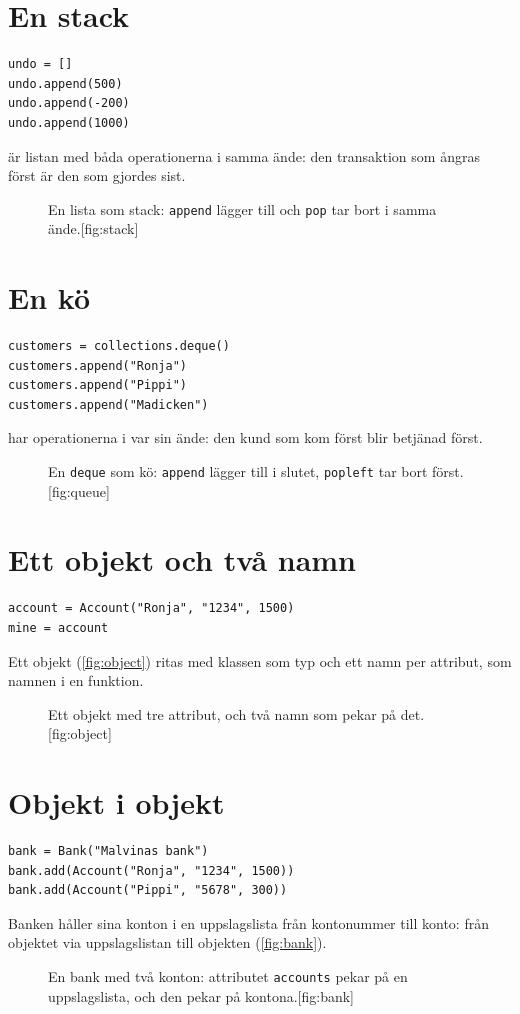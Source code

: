\documentclass[a4paper,10pt,oneside,openright,
               oldfontcommands]{memoir}
\newcommand{\entry}[3]{%
  \begin{figure}[htbp]
    \begin{sidecaption}{#2}[fig:#1]
      #3
    \end{sidecaption}
  \end{figure}
}
\begin{document}
\section{En stack}

\begin{verbatim}
undo = []
undo.append(500)
undo.append(-200)
undo.append(1000)
\end{verbatim}
 är listan med båda operationerna i samma ände: den
transaktion som ångras först är den som gjordes sist.
\entry{stack}{En lista som stack: \texttt{append} lägger till och
  \texttt{pop} tar bort i samma ände.}{\figStack}

\section{En kö}

\begin{verbatim}
customers = collections.deque()
customers.append("Ronja")
customers.append("Pippi")
customers.append("Madicken")
\end{verbatim}
 har operationerna i var sin ände: den kund som kom
först blir betjänad först.
\entry{queue}{En \texttt{deque} som kö: \texttt{append} lägger till i
  slutet, \texttt{popleft} tar bort först.}{\figQueue}

\section{Ett objekt och två namn}

\begin{verbatim}
account = Account("Ronja", "1234", 1500)
mine = account
\end{verbatim}
Ett objekt (\cref{fig:object}) ritas med klassen som typ och ett namn
per attribut, som namnen i en funktion.
\entry{object}{Ett objekt med tre attribut, och två namn som pekar på
  det.}{\figObject}

\section{Objekt i objekt}

\begin{verbatim}
bank = Bank("Malvinas bank")
bank.add(Account("Ronja", "1234", 1500))
bank.add(Account("Pippi", "5678", 300))
\end{verbatim}
Banken håller sina konton i en uppslagslista från kontonummer till
konto: från objektet via uppslagslistan till objekten
(\cref{fig:bank}).
\entry{bank}{En bank med två konton: attributet \texttt{accounts} pekar
  på en uppslagslista, och den pekar på kontona.}{\figBank}
\end{document}
